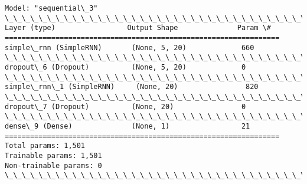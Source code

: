 \documentclass[11pt]{article}
\begin{document}
    \begin{Verbatim}[commandchars=\\\{\}]
Model: "sequential\_3"
\_\_\_\_\_\_\_\_\_\_\_\_\_\_\_\_\_\_\_\_\_\_\_\_\_\_\_\_\_\_\_\_\_\_\_\_\_\_\_\_\_\_\_\_\_\_\_\_\_\_\_\_\_\_\_\_\_\_\_\_\_\_\_\_\_
Layer (type)                 Output Shape              Param \#
=================================================================
simple\_rnn (SimpleRNN)       (None, 5, 20)             660
\_\_\_\_\_\_\_\_\_\_\_\_\_\_\_\_\_\_\_\_\_\_\_\_\_\_\_\_\_\_\_\_\_\_\_\_\_\_\_\_\_\_\_\_\_\_\_\_\_\_\_\_\_\_\_\_\_\_\_\_\_\_\_\_\_
dropout\_6 (Dropout)          (None, 5, 20)             0
\_\_\_\_\_\_\_\_\_\_\_\_\_\_\_\_\_\_\_\_\_\_\_\_\_\_\_\_\_\_\_\_\_\_\_\_\_\_\_\_\_\_\_\_\_\_\_\_\_\_\_\_\_\_\_\_\_\_\_\_\_\_\_\_\_
simple\_rnn\_1 (SimpleRNN)     (None, 20)                820
\_\_\_\_\_\_\_\_\_\_\_\_\_\_\_\_\_\_\_\_\_\_\_\_\_\_\_\_\_\_\_\_\_\_\_\_\_\_\_\_\_\_\_\_\_\_\_\_\_\_\_\_\_\_\_\_\_\_\_\_\_\_\_\_\_
dropout\_7 (Dropout)          (None, 20)                0
\_\_\_\_\_\_\_\_\_\_\_\_\_\_\_\_\_\_\_\_\_\_\_\_\_\_\_\_\_\_\_\_\_\_\_\_\_\_\_\_\_\_\_\_\_\_\_\_\_\_\_\_\_\_\_\_\_\_\_\_\_\_\_\_\_
dense\_9 (Dense)              (None, 1)                 21
=================================================================
Total params: 1,501
Trainable params: 1,501
Non-trainable params: 0
\_\_\_\_\_\_\_\_\_\_\_\_\_\_\_\_\_\_\_\_\_\_\_\_\_\_\_\_\_\_\_\_\_\_\_\_\_\_\_\_\_\_\_\_\_\_\_\_\_\_\_\_\_\_\_\_\_\_\_\_\_\_\_\_\_
    \end{Verbatim}
\end{document}
